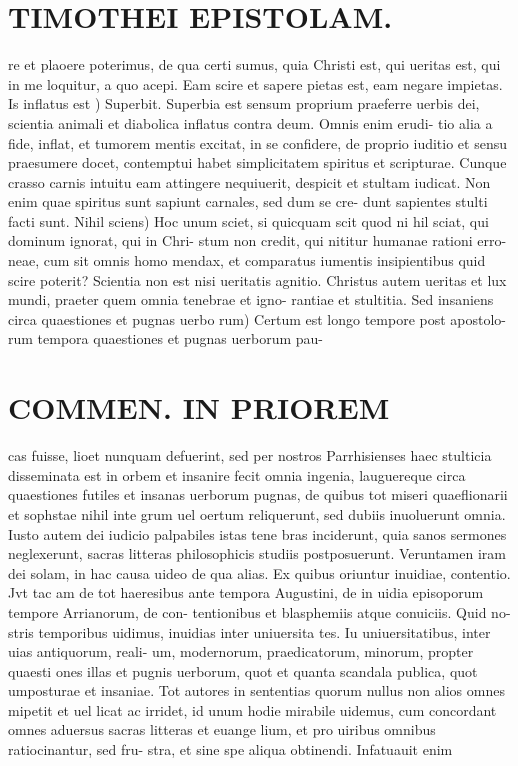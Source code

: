 \documentclass{article}
\begin{document}
\begin{pages}
\section*{TIMOTHEI EPISTOLAM. }
\marginpar{[ p.157 ]}\pstart re et plaoere poterimus, de qua certi sumus, quia Christi est, qui ueritas est, qui in me loquitur, a quo acepi. Eam scire et sapere pietas est, eam negare impietas.  \pend\pstart Is inflatus est ) Superbit. Superbia est sensum proprium praeferre uerbis dei, scientia animali et diabolica inflatus contra deum. Omnis enim erudi- tio alia a fide, inflat, et tumorem mentis excitat, in se confidere, de proprio iuditio et sensu praesumere docet, contemptui habet simplicitatem spiritus et scripturae. Cunque crasso carnis intuitu eam attingere nequiuerit, despicit et stultam iudicat. Non enim quae spiritus sunt sapiunt carnales, sed dum se cre- dunt sapientes stulti facti sunt.  \pend\pstart Nihil sciens) Hoc unum sciet, si quicquam scit quod ni hil sciat, qui dominum ignorat, qui in Chri- stum non credit, qui nititur humanae rationi erro- neae, cum sit omnis homo mendax, et comparatus iumentis insipientibus quid scire poterit? Scientia non est nisi ueritatis agnitio. Christus autem ueritas et lux mundi, praeter quem omnia tenebrae et igno- rantiae et stultitia.  \pend\pstart Sed insaniens circa quaestiones et pugnas uerbo rum) Certum est longo tempore post apostolo- rum tempora quaestiones et pugnas uerborum pau-  \pend
\section*{COMMEN. IN PRIOREM }
\marginpar{[ p.158 ]}\pstart cas fuisse, lioet nunquam defuerint, sed per nostros Parrhisienses haec stulticia disseminata est in orbem et insanire fecit omnia ingenia, lauguereque circa quaestiones futiles et insanas uerborum pugnas, de quibus tot miseri quaeflionarii et sophstae nihil inte grum uel oertum reliquerunt, sed dubiis inuoluerunt omnia. Iusto autem dei iudicio palpabiles istas tene bras inciderunt, quia sanos sermones neglexerunt, sacras litteras philosophicis studiis postposuerunt. Veruntamen iram dei solam, in hac causa uideo de qua alias.  \pend\pstart Ex quibus oriuntur inuidiae, contentio. Jvt tac am de tot haeresibus ante tempora Augustini, de in uidia episoporum tempore Arrianorum, de con- tentionibus et blasphemiis atque conuiciis. Quid no- stris temporibus uidimus, inuidias inter uniuersita tes. Iu uniuersitatibus, inter uias antiquorum, reali- um, modernorum, praedicatorum, minorum, propter quaesti ones illas et pugnis uerborum, quot et quanta scandala publica, quot umposturae et insaniae. Tot autores in sententias quorum nullus non alios omnes mipetit et uel licat ac irridet, id unum hodie mirabile uidemus, cum concordant omnes aduersus sacras litteras et euange lium, et pro uiribus omnibus ratiocinantur, sed fru- stra, et sine spe aliqua obtinendi. Infatuauit enim  \pend

\end{pages}
\end{document}
